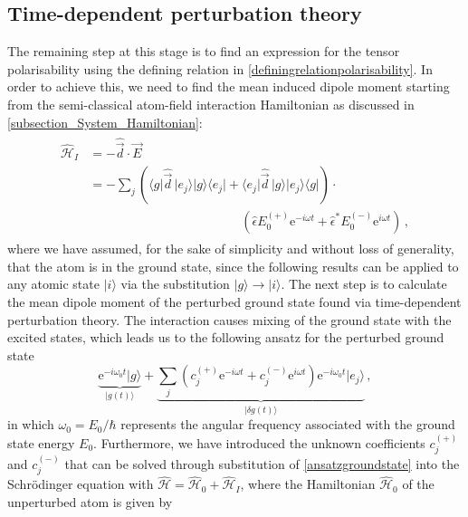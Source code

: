 \documentclass[../Thesis-IJspeert.tex]{subfiles}
\begin{document}
\subsection{Time-dependent perturbation theory}
The remaining step at this stage is to find an expression for the tensor polarisability using the defining relation in \autoref{definingrelationpolarisability}. In order to achieve this, we need to find the mean induced dipole moment starting from the semi-classical atom-field interaction Hamiltonian as discussed in \autoref{subsection_System_Hamiltonian}:
\begin{align}
\begin{split}
	\hat{\mathcal{H}}_I &= -\hat{\vec{d}} \cdot \vec{E} \\ &=-\sum_{j} \left( \langle g \vert \hat{\vec{d}}\, \vert e_j \rangle \vert g \rangle \langle e_j \vert +  \langle e_j \vert \hat{\vec{d}}\, \vert g \rangle \vert e_j \rangle \langle g \vert \right) \cdot \\ &\hspace{12em} \left( \hat{\epsilon}E_0^{(+)} \mathrm{e}^{-i\omega t} + \hat{\epsilon}^*E_0^{(-)} \mathrm{e}^{i\omega t} \right) \,,
\end{split}
\end{align}
where we have assumed, for the sake of simplicity and without loss of generality, that the atom is in the ground state, since the following results can be applied to any atomic state $\vert i \rangle$ via the substitution $\vert g \rangle \rightarrow \vert i \rangle$. The next step is to calculate the mean dipole moment of the perturbed ground state found via time-dependent perturbation theory. The interaction causes mixing of the ground state with the excited states, which leads us to the following ansatz for the perturbed ground state
\begin{equation}
\label{ansatzgroundstate}
	\underbrace{\mathrm{e}^{-i\omega_0 t} \vert g \rangle}_{\vert g(t) \rangle} + \underbrace{\sum_j \left( c_j^{(+)} \mathrm{e}^{-i\omega t} + c_j^{(-)} \mathrm{e}^{i\omega t} \right) \mathrm{e}^{-i\omega_0 t} \vert e_j \rangle }_{\vert \delta g (t) \rangle} \,,
\end{equation}
in which $\omega_0=E_0/\hbar$ represents the angular frequency associated with the ground state energy $E_0$. Furthermore, we have introduced the unknown coefficients $c_j^{(+)}$ and $c_j^{(-)}$ that can be solved through substitution of \autoref{ansatzgroundstate} into the Schrödinger equation with $\hat{\mathcal{H}}=\hat{\mathcal{H}}_0+\hat{\mathcal{H}}_I$, where the Hamiltonian $\hat{\mathcal{H}}_0$ of the unperturbed atom is given by
\end{document}
